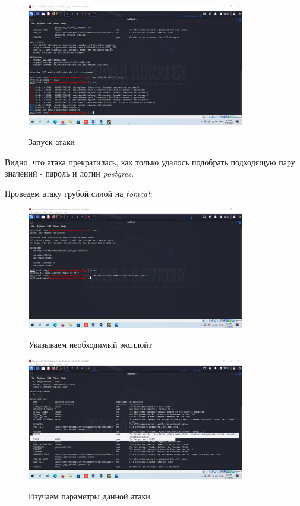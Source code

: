 \documentclass[a4paper]{article}
\begin{document}
  \begin{figure}[H]
    \centering
    \includegraphics[width=0.85\textwidth]{04_0054}
    \label{img:54}
    \caption{Запуск атаки}
  \end{figure}

  Видно, что атака прекратилась, как только удалось подобрать подходящую пару значений -
  пароль и логин \textit{postgres}.

  Проведем атаку грубой силой на \textit{tomcat}:

  \begin{figure}[H]
    \centering
    \includegraphics[width=0.85\textwidth]{04_0055}
    \label{img:55}
    \caption{Указываем необходимый эксплойт}
  \end{figure}

  \begin{figure}[H]
    \centering
    \includegraphics[width=0.85\textwidth]{04_0056}
    \label{img:56}
    \caption{Изучаем параметры данной атаки}
  \end{figure}
\end{document}
